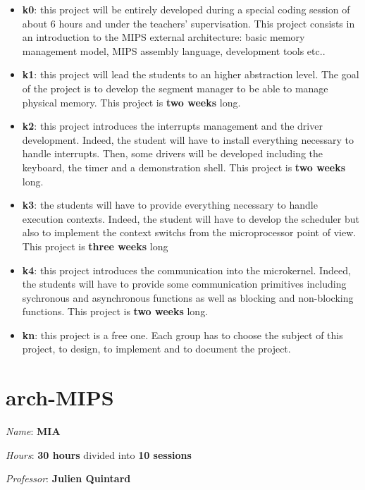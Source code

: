 \begin{multicols}{2}
\begin{itemize}
  \item
    \textbf{k0}: this project will be entirely developed during a
    special coding session of about 6 hours and under the teachers'
    supervisation. This project consists in an introduction to the
    MIPS external architecture: basic memory management model,
    MIPS assembly language, development tools etc..
  \item
    \textbf{k1}: this project will lead the students to an higher abstraction
    level. The goal of the project is to develop the segment manager to be
    able to manage physical memory. This project is \textbf{two weeks} long.
  \item
    \textbf{k2}: this project introduces the interrupts management and
    the driver development. Indeed, the student will have to install
    everything necessary to handle interrupts. Then, some drivers will
    be developed including the keyboard, the timer and a demonstration shell.
    This project is \textbf{two weeks} long.
  \item
    \textbf{k3}: the students will have to provide everything necessary
    to handle execution contexts. Indeed, the student will have to
    develop the scheduler but also to implement the context switchs from
    the microprocessor point of view. This project is \textbf{three weeks}
    long
  \item
    \textbf{k4}: this project introduces the communication into the
    microkernel. Indeed, the students will have to provide some
    communication primitives including sychronous and asynchronous
    functions as well as blocking and non-blocking functions. This project
    is \textbf{two weeks} long.
  \item
    \textbf{kn}: this project is a free one. Each group has to choose the
    subject of this project, to design, to implement and to document
    the project.
\end{itemize}

%
%

\section{arch-MIPS}

\textit{Name}: \textbf{MIA}

\textit{Hours}: \textbf{30 hours} divided into \textbf{10 sessions}

\textit{Professor}: \textbf{Julien Quintard}


\end{multicols}
